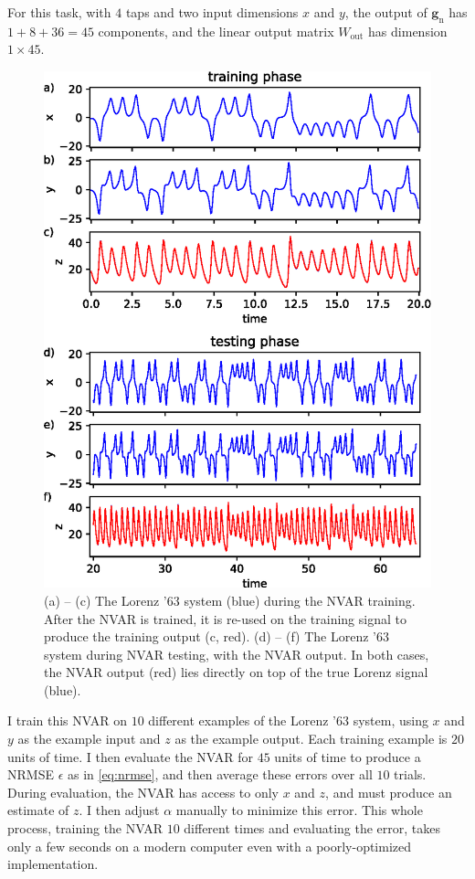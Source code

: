 For this task, with $4$ taps and two input dimensions $x$ and $y$, the
output of $\bm{g}_\text{n}$ has $1 + 8 + 36 = 45$ components, and the linear
output matrix $W_\text{out}$ has dimension $1 \times 45$.

\begin{figure}
  \includegraphics{figures/nvar-infer-lorenz}
  \caption{(a) -- (c) The Lorenz '63 system (blue) during the NVAR
    training. After the NVAR is trained, it is re-used on the
    training signal to produce the training output (c, red). (d) --
    (f) The Lorenz '63 system during NVAR testing, with the NVAR
    output. In both cases, the NVAR output (red) lies directly on top
    of the true Lorenz signal (blue).}
  \label{fig:nvar-infer-lorenz}
\end{figure}

I train this NVAR on $10$ different examples of the Lorenz '63
system, using $x$ and $y$ as the example input and $z$ as the example
output. Each training example is $20$ units of time. I then evaluate
the NVAR for $45$ units of time to produce a NRMSE $\epsilon$ as in
\cref{eq:nrmse}, and then average these errors over all $10$
trials. During evaluation, the NVAR has access to only $x$ and $z$,
and must produce an estimate of $z$. I then adjust $\alpha$ manually
to minimize this error. This whole process, training the NVAR $10$
different times and evaluating the error, takes only a few seconds on
a modern computer even with a poorly-optimized implementation.

